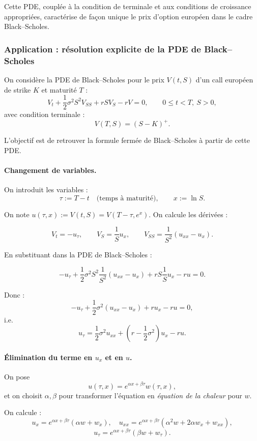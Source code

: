 \documentclass[11pt,a4paper]{article}
\newcommand{\1}{\mathbf{1}}
\begin{document}
Cette PDE, coupl\'ee \`a la condition de terminale et aux conditions de croissance
appropri\'ees, caract\'erise de fa\c{c}on unique le prix d'option europ\'een
dans le cadre Black--Scholes.


\subsubsection{Application : r\'esolution explicite de la PDE de Black--Scholes}

On consid\`ere la PDE de Black--Scholes pour le prix $V(t,S)$ d'un call europ\'een
de strike $K$ et maturit\'e $T$ :
\[
V_t + \frac12 \sigma^2 S^2 V_{SS} + r S V_S - r V = 0,
\qquad 0 \le t < T,\ S>0,
\]
avec condition terminale :
\[
V(T,S) = (S-K)^+.
\]

L'objectif est de retrouver la formule ferm\'ee de Black--Scholes \`a partir de cette PDE.

\paragraph{Changement de variables.}

On introduit les variables :
\[
\tau := T - t \quad\text{(temps \`a maturit\'e)},
\qquad
x := \ln S.
\]

On note $u(\tau,x) := V(t,S) = V(T-\tau,e^x)$.
On calcule les d\'eriv\'ees :

\[
V_t = -u_\tau,
\qquad
V_S = \frac{1}{S} u_x,
\qquad
V_{SS} = \frac{1}{S^2}(u_{xx} - u_x).
\]

En substituant dans la PDE de Black--Scholes :

\[
-u_\tau + \frac12 \sigma^2 S^2 \frac{1}{S^2}(u_{xx} - u_x)
+ r S \frac{1}{S}u_x - r u = 0.
\]

Donc :
\[
-u_\tau + \frac12 \sigma^2 (u_{xx} - u_x) + r u_x - r u = 0,
\]
i.e.
\[
u_\tau = \frac12 \sigma^2 u_{xx}
+ \left(r - \frac12 \sigma^2\right) u_x - r u.
\]

\paragraph{\'Elimination du terme en $u_x$ et en $u$.}

On pose
\[
u(\tau,x) = e^{\alpha x + \beta \tau} w(\tau,x),
\]
et on choisit $\alpha,\beta$ pour transformer l'\'equation en \emph{\'equation de la chaleur}
pour $w$.

On calcule :
\[
u_x = e^{\alpha x + \beta \tau} (\alpha w + w_x), \quad
u_{xx} = e^{\alpha x + \beta \tau} (\alpha^2 w + 2\alpha w_x + w_{xx}),
\]
\[
u_\tau = e^{\alpha x + \beta \tau} (\beta w + w_\tau).
\]
\end{document}
